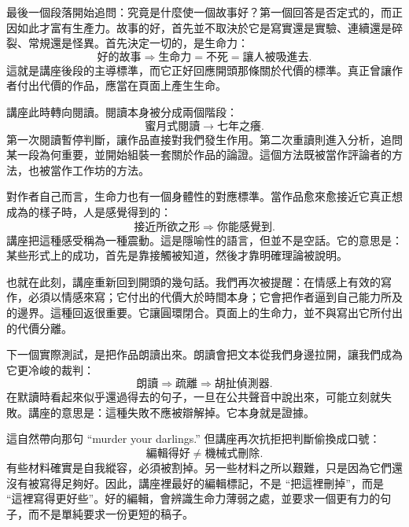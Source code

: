 最後一個段落開始追問：究竟是什麼使一個故事好？第一個回答是否定式的，而正因如此才富有生產力。故事的好，首先並不取決於它是寫實還是實驗、連續還是碎裂、常規還是怪異。首先決定一切的，是生命力：
\begin{equation}
\text{好的故事} \Rightarrow \text{生命力} = \text{不死} = \text{讓人被吸進去}.
\end{equation}
這就是講座後段的主導標準，而它正好回應開頭那條關於代價的標準。真正曾讓作者付出代價的作品，應當在頁面上產生生命。

講座此時轉向閱讀。閱讀本身被分成兩個階段：
\begin{equation}
\text{蜜月式閱讀} \to \text{七年之癢}.
\end{equation}
第一次閱讀暫停判斷，讓作品直接對我們發生作用。第二次重讀則進入分析，追問某一段為何重要，並開始組裝一套關於作品的論證。這個方法既被當作評論者的方法，也被當作工作坊的方法。

對作者自己而言，生命力也有一個身體性的對應標準。當作品愈來愈接近它真正想成為的樣子時，人是感覺得到的：
\begin{equation}
\text{接近所欲之形} \Rightarrow \text{你能感覺到}.
\end{equation}
講座把這種感受稱為一種震動。這是隱喻性的語言，但並不是空話。它的意思是：某些形式上的成功，首先是靠接觸被知道，然後才靠明確理論被說明。

也就在此刻，講座重新回到開頭的幾句話。我們再次被提醒：在情感上有效的寫作，必須以情感來寫；它付出的代價大於時間本身；它會把作者逼到自己能力所及的邊界。這種回返很重要。它讓圓環閉合。頁面上的生命力，並不與寫出它所付出的代價分離。

下一個實際測試，是把作品朗讀出來。朗讀會把文本從我們身邊拉開，讓我們成為它更冷峻的裁判：
\begin{equation}
\text{朗讀} \Rightarrow \text{疏離} \Rightarrow \text{胡扯偵測器}.
\end{equation}
在默讀時看起來似乎還過得去的句子，一旦在公共聲音中說出來，可能立刻就失敗。講座的意思是：這種失敗不應被辯解掉。它本身就是證據。

這自然帶向那句 ``murder your darlings.'' 但講座再次抗拒把判斷偷換成口號：
\begin{equation}
\text{編輯得好} \neq \text{機械式刪除}.
\end{equation}
有些材料確實是自我縱容，必須被割掉。另一些材料之所以艱難，只是因為它們還沒有被寫得足夠好。因此，講座裡最好的編輯標記，不是 ``把這裡刪掉''，而是 ``這裡寫得更好些''。好的編輯，會辨識生命力薄弱之處，並要求一個更有力的句子，而不是單純要求一份更短的稿子。

